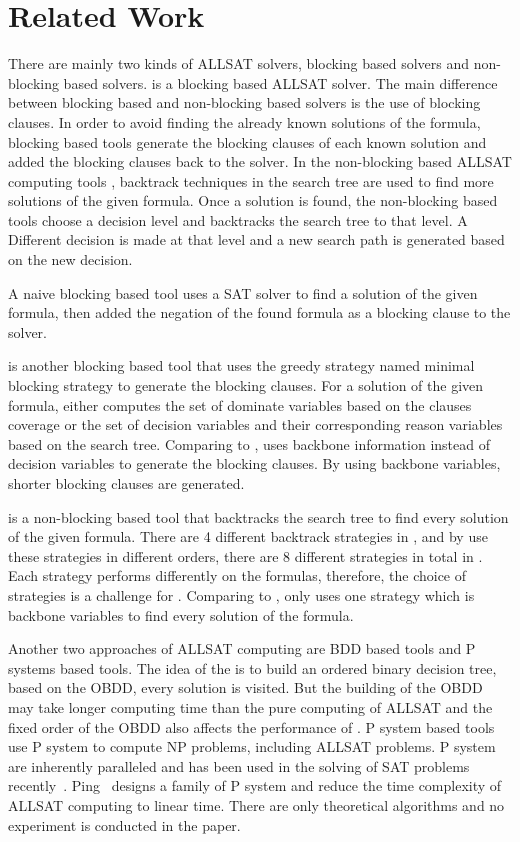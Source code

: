 \section{Related Work} \label{sec:rela}
There are mainly two kinds of ALLSAT solvers, blocking based solvers and non-blocking based solvers.
\tool is a blocking based ALLSAT solver.
The main difference between blocking based and non-blocking based solvers is the use of blocking clauses.
In order to avoid finding the already known solutions of the formula, blocking based tools generate the blocking clauses of each known solution and added the blocking clauses back to the solver.
In the non-blocking based ALLSAT computing tools \cite{zhao2009asig} \cite{grumberg2004memory} \cite{jabbour2014extending} \cite{ietool}, backtrack techniques in the search tree are used to find more solutions of the given formula. Once a solution is found, the non-blocking based tools choose a decision level and backtracks the search tree to that level. A Different decision is made at that level and a new search path is generated based on the new decision.

A naive blocking based tool \cite{mcmillan2002applying} uses a SAT solver to find a solution of the given formula, then added the negation of the found formula as a blocking clause to the solver.

\ctool\cite{ietool} is another blocking based tool that uses the greedy strategy named minimal blocking strategy to generate the blocking clauses.
For a solution of the given formula, \ctool either computes the set of dominate variables based on the clauses coverage or the set of decision variables and their corresponding reason variables based on the search tree.
Comparing to \ctool, \tool uses backbone information instead of decision variables to generate the blocking clauses. By using backbone variables, shorter blocking clauses are generated.

\nbc\cite{ietool} is a non-blocking based tool that backtracks the search tree to find every solution of the given formula. There are 4 different backtrack strategies in \nbc, and by use these strategies in different orders, there are 8 different strategies in total in \nbc. Each strategy performs differently on the formulas, therefore, the choice of strategies is a challenge for \nbc. 
Comparing to \nbc, \tool only uses one strategy which is backbone variables to find every solution of the formula.

Another two approaches of ALLSAT computing are BDD based tools and P systems based tools. The idea of the \bdd is to build an ordered binary decision tree, based on the OBDD, every solution is visited. But the building of the OBDD may take longer computing time than the pure computing of ALLSAT and the fixed order of the OBDD also affects the performance of \bdd.
P system based tools use P system to compute NP problems, including ALLSAT problems. P system are inherently paralleled and has been used in the solving of SAT problems recently~\cite{p}. Ping~\cite{pa} designs a family of P system and reduce the time complexity of ALLSAT computing to linear time. There are only theoretical algorithms and no experiment is conducted in the paper.

